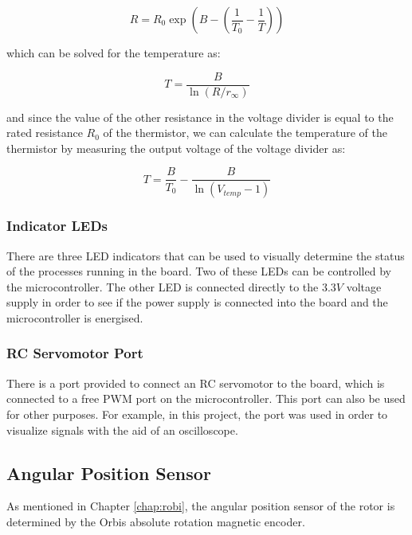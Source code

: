 \begin{equation}
	R=R_{0}\exp({B-(\frac{1}{T_{0}}-\frac{1}{T})})  
\end{equation}

\noindent
which can be solved for the temperature as:

\begin{equation}
	T=\frac{B}{\ln(R/r_{\infty})}
\end{equation}

\noindent
and since the value of the other resistance in the voltage divider is equal to the rated resistance $R_{0}$ of the thermistor, we can calculate the temperature of the thermistor by measuring the output voltage of the voltage divider as:

\begin{equation}
	T = \frac{B}{T_{0}} - \frac{B}{\ln(V_{temp}-1)}
\end{equation}

\subsubsection{Indicator LEDs}

There are three LED indicators that can be used to visually determine the status of the processes running in the board. Two of these LEDs can be controlled by the microcontroller. The other LED is connected directly to the $3.3V$ voltage supply in order to see if the power supply is connected into the board and the microcontroller is energised.

\subsubsection{RC Servomotor Port}

There is a port provided to connect an RC servomotor to the board, which is connected to a free \ac{PWM} port on the microcontroller. This port can also be used for other purposes. For example, in this project, the port was used in order to visualize signals with the aid of an oscilloscope.

\subsection{Angular Position Sensor}\label{sub:gears}

As mentioned in Chapter \ref{chap:robi}, the angular position sensor of the rotor is determined by the Orbis absolute rotation magnetic encoder. 

